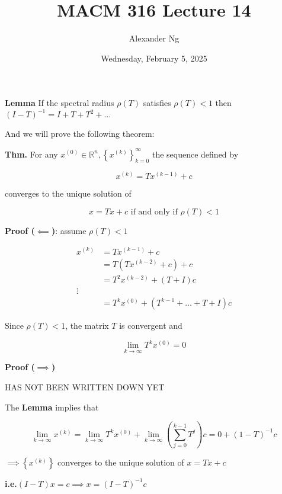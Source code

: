 \documentclass[12pt]{article}
\newcommand{\thm}{\textbf{Thm.}\xspace}
\newcommand{\ie}{\textbf{i.e.}\xspace}
\newcommand{\lemma}{\textbf{Lemma}\xspace}
\newcommand{\bproof}{\textbf{Proof ($\impliedby$)}\xspace}
\newcommand{\fproof}{\textbf{Proof ($\implies$)}\xspace}
\begin{document}
\title{MACM 316 Lecture 14}
\author{Alexander Ng}
\date{Wednesday, February 5, 2025}

\maketitle

\lemma If the spectral radius $\rho(T)$ satisfies $\rho(T) < 1$ then 
$(I-T)^{-1} = I + T + T^2 + \dots$

And we will prove the following theorem:

\thm For any $x^{(0)} \in \mathbb{R}^n, \left\{ x^{(k)} \right\}_{k=0}^\infty$
the sequence defined by 

\begin{equation*}
  x^{(k)} = Tx^{(k-1)} + c
\end{equation*}

converges to the unique solution of 

\begin{equation*}
  x = Tx + c \text{ if and only if }  \rho(T)<1
\end{equation*}

\bproof: assume $\rho(T)<1$

\begin{align*}
  x^{(k)} &= Tx^{(k-1)} + c \\
  &= T(Tx^{(k-2)} + c) + c \\
  &= T^2x^{(k-2)} + (T+I)c \\
  \vdots \\
  &= T^kx^{(0)} + (T^{k-1}+\dots+T+I)c 
\end{align*}

Since $\rho(T)<1$, the matrix $T$ is convergent and

\begin{equation*}
  \lim_{k \to \infty} T^kx^{(0)} = 0
\end{equation*}

\fproof

HAS NOT BEEN WRITTEN DOWN YET

The \lemma implies that 

\begin{equation*}
  \lim_{k \to \infty} x^{(k)} = \lim_{k \to \infty} T^kx^{(0)} + \lim_{k \to \infty} \left(\sum_{j=0}^{k-1} T^j \right)c = 0 + (1-T)^{-1}c
\end{equation*}

$\implies \left\{ x^{(k)} \right\}$ converges to the unique solution of $x=Tx+c$

\ie $(I-T)x = c \implies x = (I-T)^{-1}c$
\end{document}
